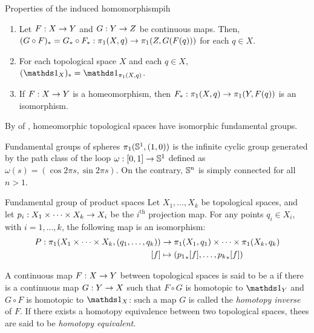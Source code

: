 \begin{lemma}[before upper = {\tcbtitle}]{Properties of the induced homomorphism}{pih}
  \begin{enumerate}
    \item \label{item:pih-1} Let $ F : X \rightarrow Y $ and $ G : Y \rightarrow Z $ be continuous maps. Then, $ (G \circ F)_* = G_* \circ F_* : \pi_1(X,q) \rightarrow \pi_1(Z , G(F(q))) $ for each $ q \in X $.
    \item \label{item:pih-2} For each topological space $ X $ and each $ q \in X $, $ (\id_X)_* = \id_{\pi_1(X,q)} $.
    \item \label{item:pih-3} If $ F : X \rightarrow Y $ is a homeomorphism, then $ F_* : \pi_1(X,q) \rightarrow \pi_1(Y,F(q)) $ is an isomorphism.
  \end{enumerate}
\end{lemma}

By  of , homeomorphic topological spaces have isomorphic fundamental groups.

\begin{example}{Fundamental groups of spheres}{}
  $ \pi_1(\mathbb{S}^{1} , (1,0)) $ is the infinite cyclic group generated by the path class of the loop $ \omega : [0,1] \rightarrow \mathbb{S}^{1} $ defined as $ \omega(s) = (\cos 2\pi s , \sin 2\pi s) $.
  On the contrary, $ \mathbb{S}^{n} $ is simply connected for all $ n > 1 $.
\end{example}

\begin{proposition}{Fundamental group of product spaces}{}
  Let $ X_1 , \dots , X_k $ be topological spaces, and let $ p_i : X_1 \times \dots \times X_k \rightarrow X_i $ be the $ i^\text{th} $ projection map. For any points $ q_i \in X_i $, with $ i = 1 , \dots , k $, the following map is an isomorphism:
  \begin{align*}
    P : \pi_1(X_1 \times \dots \times X_k , (q_1 , \dots , q_k)) &\rightarrow \pi_1(X_1 , q_1) \times \dots \times \pi_1(X_k , q_k) \\
    [f] &\mapsto ({p_1}_*[f] , \dots , {p_k}_*[f])
  \end{align*}
\end{proposition}

A continuous map $ F : X \rightarrow Y $ between topological spaces is said to be a  if there is a continuous map $ G : Y \rightarrow X $ such that $ F \circ G $ is homotopic to $ \id_Y $ and $ G \circ F $ is homotopic to $ \id_X $: such a map $ G $ is called the \emph{homotopy inverse} of $ F $. If there exists a homotopy equivalence between two topological spaces, thees are said to be \emph{homotopy equivalent}.

